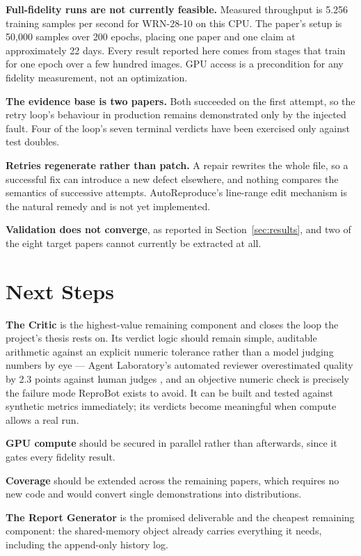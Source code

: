\documentclass[10pt,twocolumn]{article}
\begin{document}
\textbf{Full-fidelity runs are not currently feasible.} Measured throughput is 5.256
training samples per second for WRN-28-10 on this CPU. The paper's setup is 50{,}000
samples over 200 epochs, placing one paper and one claim at approximately 22 days. Every
result reported here comes from stages that train for one epoch over a few hundred
images. GPU access is a precondition for any fidelity measurement, not an optimization.

\textbf{The evidence base is two papers.} Both succeeded on the first attempt, so the
retry loop's behaviour in production remains demonstrated only by the injected fault.
Four of the loop's seven terminal verdicts have been exercised only against test doubles.

\textbf{Retries regenerate rather than patch.} A repair rewrites the whole file, so a
successful fix can introduce a new defect elsewhere, and nothing compares the semantics of
successive attempts. AutoReproduce's line-range edit mechanism
\cite{zhao2025autoreproduce} is the natural remedy and is not yet implemented.

\textbf{Validation does not converge}, as reported in Section~\ref{sec:results}, and two
of the eight target papers cannot currently be extracted at all.

\section{Next Steps}
\label{sec:next}

\textbf{The Critic} is the highest-value remaining component and closes the loop the
project's thesis rests on. Its verdict logic should remain simple, auditable arithmetic
against an explicit numeric tolerance rather than a model judging numbers by eye ---
Agent Laboratory's automated reviewer overestimated quality by 2.3 points against human
judges \cite{schmidgall2025agentlab}, and an objective numeric check is precisely the
failure mode ReproBot exists to avoid. It can be built and tested against synthetic
metrics immediately; its verdicts become meaningful when compute allows a real run.

\textbf{GPU compute} should be secured in parallel rather than afterwards, since it gates
every fidelity result.

\textbf{Coverage} should be extended across the remaining papers, which requires no new
code and would convert single demonstrations into distributions.

\textbf{The Report Generator} is the promised deliverable and the cheapest remaining
component: the shared-memory object already carries everything it needs, including the
append-only history log.
\end{document}
